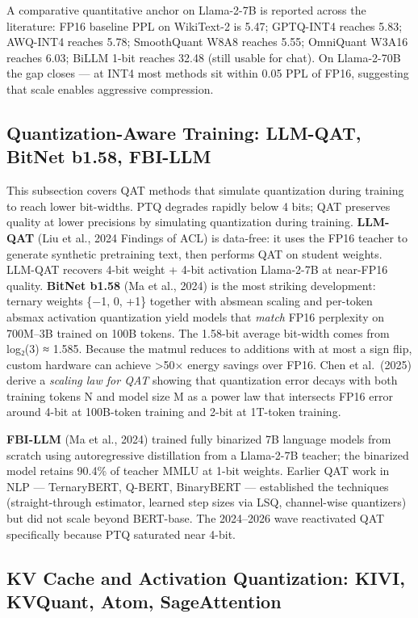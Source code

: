 A comparative quantitative anchor on Llama-2-7B is reported across the literature: FP16 baseline PPL on WikiText-2 is 5.47; GPTQ-INT4 reaches 5.83; AWQ-INT4 reaches 5.78; SmoothQuant W8A8 reaches 5.55; OmniQuant W3A16 reaches 6.03; BiLLM 1-bit reaches 32.48 (still usable for chat). On Llama-2-70B the gap closes --- at INT4 most methods sit within 0.05 PPL of FP16, suggesting that scale enables aggressive compression.

\subsection{Quantization-Aware Training: LLM-QAT, BitNet b1.58, FBI-LLM}\label{quantization-aware-training-llm-qat-bitnet-b1.58-fbi-llm}

This subsection covers QAT methods that simulate quantization during training to reach lower bit-widths. PTQ degrades rapidly below 4 bits; QAT preserves quality at lower precisions by simulating quantization during training. \textbf{LLM-QAT} (Liu et al., 2024 Findings of ACL) is data-free: it uses the FP16 teacher to generate synthetic pretraining text, then performs QAT on student weights. LLM-QAT recovers 4-bit weight + 4-bit activation Llama-2-7B at near-FP16 quality. \textbf{BitNet b1.58} (Ma et al., 2024) is the most striking development: ternary weights \{−1, 0, +1\} together with absmean scaling and per-token absmax activation quantization yield models that \emph{match} FP16 perplexity on 700M--3B trained on 100B tokens. The 1.58-bit average bit-width comes from log₂(3) ≈ 1.585. Because the matmul reduces to additions with at most a sign flip, custom hardware can achieve \textgreater50× energy savings over FP16. Chen et al.~(2025) derive a \emph{scaling law for QAT} showing that quantization error decays with both training tokens N and model size M as a power law that intersects FP16 error around 4-bit at 100B-token training and 2-bit at 1T-token training.

\textbf{FBI-LLM} (Ma et al., 2024) trained fully binarized 7B language models from scratch using autoregressive distillation from a Llama-2-7B teacher; the binarized model retains 90.4\% of teacher MMLU at 1-bit weights. Earlier QAT work in NLP --- TernaryBERT, Q-BERT, BinaryBERT --- established the techniques (straight-through estimator, learned step sizes via LSQ, channel-wise quantizers) but did not scale beyond BERT-base. The 2024--2026 wave reactivated QAT specifically because PTQ saturated near 4-bit.

\subsection{KV Cache and Activation Quantization: KIVI, KVQuant, Atom, SageAttention}\label{kv-cache-and-activation-quantization-kivi-kvquant-atom-sageattention}

